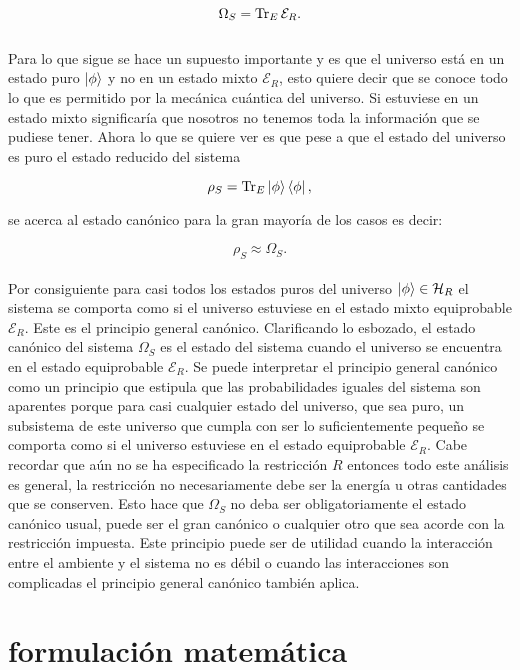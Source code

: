 \begin{equation}
 \Omega_{S} =\Tr_{E} \mathcal{E}_{R}.
\end{equation}
\\
Para lo que sigue se hace un supuesto importante  y es que el universo está en un estado puro $\ket{\phi}$ y no en un estado mixto $\mathcal{E}_{R}$, esto quiere decir que se conoce todo lo que es permitido por la mecánica cuántica del universo. Si estuviese en un estado mixto significaría que nosotros no tenemos toda la información que se pudiese tener. Ahora lo que se quiere ver es que  pese a que el estado del universo es puro el estado reducido del sistema

\begin{equation}
\rho_{S}=\Tr_{E}\ket{\phi}\bra{\phi},
\end{equation}

se acerca al estado canónico para la gran mayoría de los casos es decir:

\begin{equation}
\rho_{S} \approx \Omega_{S}.
\end{equation}
\\
Por consiguiente para casi todos los estados puros del universo $\ket{\phi} \in \mathcal{H}_{R}$ el sistema se comporta como si el universo estuviese en el estado mixto equiprobable $\mathcal{E}_{R}$. Este  es el principio general canónico. Clarificando lo esbozado, el estado canónico del sistema $\Omega_{S}$ es el estado del sistema cuando el universo se encuentra en el estado equiprobable $\mathcal{E}_{R}$. Se puede interpretar el principio general canónico como un principio que estipula que las probabilidades iguales del sistema son aparentes porque para casi cualquier estado del universo, que sea puro, un subsistema de este universo que cumpla con ser lo suficientemente pequeño se comporta como si el universo estuviese en el estado equiprobable $\mathcal{E}_{R}$. Cabe recordar que aún no se ha especificado la restricción $R$ entonces todo este análisis es general, la restricción no necesariamente debe ser la energía u otras cantidades que se conserven. Esto hace que $\Omega_{S}$ no  deba ser obligatoriamente el estado canónico usual, puede ser el gran canónico o cualquier otro que sea acorde con la restricción impuesta. Este principio puede ser de utilidad cuando la interacción entre el ambiente y el sistema no es débil o cuando las interacciones son complicadas el principio general canónico también aplica.

\section{formulación matemática}

